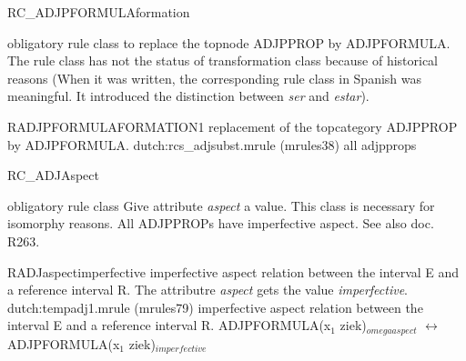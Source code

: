 \begin{mruleclass}{RC\_ADJPFORMULAformation}
\begin{classdescr}
\kind obligatory rule class
\classtask to replace the topnode ADJPPROP by ADJPFORMULA. 
\classremarks \mbox{}
The rule class has not the status of transformation class 
because of historical reasons (When it was written, the corresponding
rule class in Spanish was meaningful. It introduced the distinction between 
{\em ser} and {\em estar}).

\nofilters
\nospeedrules
{}
\end{classdescr}

\begin{members}
\begin{member}
 RADJPFORMULAFORMATION1
 replacement of the topcategory ADJPPROP by ADJPFORMULA. 
\file dutch:rcs\_adjsubst.mrule (mrules38)
\semantics \nosemantics
\example all adjpprops
\remarks\mbox{}
\end{member}

\end{members}

\end{mruleclass}
\begin{mruleclass}{RC\_ADJAspect}
\begin{classdescr}
\kind obligatory rule class
\classtask 
Give attribute {\em aspect} a value.
\classremarks
This class is necessary for isomorphy reasons. All ADJPPROPs have imperfective 
aspect. See also doc. R263.
\nofilters

\nospeedrules

\noplannedrules

\norulesnotince
{}
\end{classdescr}
\begin{members}
\begin{member}
 RADJaspectimperfective
imperfective aspect relation between the interval E and a 
reference interval R.
The attributre {\em aspect} gets the  value {\em imperfective}.
\file dutch:tempadj1.mrule (mrules79)
\semantics 
imperfective aspect relation between the interval E and a 
reference interval R.
\example\mbox{}
 ADJPFORMULA(x$_{1}$ ziek)$_{omegaaspect}$ $\leftrightarrow$\\
ADJPFORMULA(x$_{1}$ ziek)$_{imperfective}$
\remarks\mbox{}

\end{member}

\end{members}

\end{mruleclass}


